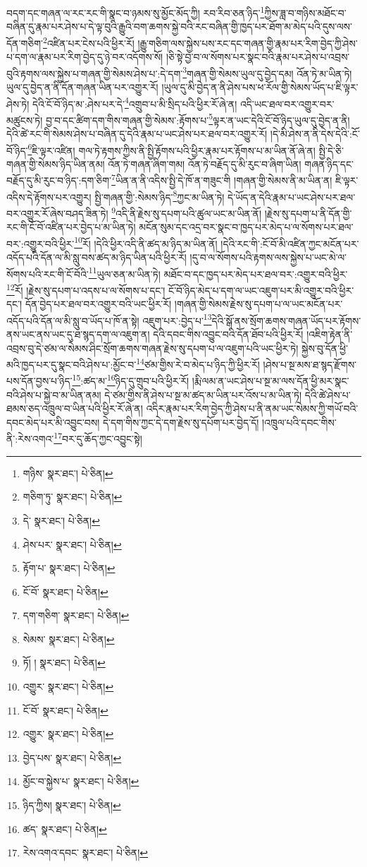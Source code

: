 བདག་དང་གཞན་ལ་རང་རང་གི་སྣང་བ་ཉམས་སུ་མྱོང་མོད་ཀྱི། རབ་རིབ་ཅན་ཉིད་\footnote{གཉིས་  སྣར་ཐང་།  པེ་ཅིན། }ཀྱིས་ཟླ་བ་གཉིས་མཐོང་བ་བཞིན་དུ་རྣམ་པར་ཤེས་པ་དེ་ལྟ་བུའི་རྒྱུའི་བག་ཆགས་སྐྱེ་བའི་རང་བཞིན་གྱི་ཁྱད་པར་ཐོག་མ་མེད་པའི་དུས་ལས་དོན་གཅིག་\footnote{གཅིག་ཏུ་  སྣར་ཐང་།  པེ་ཅིན། }འཛིན་པར་ངེས་པའི་ཕྱིར་རོ། །རྒྱུ་གཅིག་ལས་སྐྱེས་པས་རང་དང་གཞན་གྱི་རྣམ་པར་རིག་བྱེད་ཀྱི་ཤེས་པ་དག་ལ་རྣམ་པར་རིག་བྱེད་དུ་ཉེ་བར་འདོགས་སོ། །ཅི་སྟེ་བྱ་བ་ལ་སོགས་པར་སྣང་བའི་རྣམ་པར་ཤེས་པ་འབྲས་བུའི་རྟགས་ལས་སྐྱེས་པ་གཞན་གྱི་སེམས་ཤེས་པ་:དེ་དག་\footnote{དེ་  སྣར་ཐང་།  པེ་ཅིན། }གཞན་གྱི་སེམས་ཡུལ་དུ་བྱེད་དམ། འོན་ཏེ་མ་ཡིན་ཏེ། ཡུལ་དུ་བྱེད་ན་ནི་དོན་གཞན་ཡིན་པར་འགྱུར་རོ། །ཡུལ་དུ་མི་བྱེད་ན་ནི་ཤེས་པས་ཕ་རོལ་གྱི་སེམས་ཡོད་པ་ཇི་ལྟར་ཤེས་ཏེ། དེའི་ངོ་བོ་ཉིད་མ་:ཤེས་པར་དེ་\footnote{ཤེས་པར་  སྣར་ཐང་།  པེ་ཅིན། }འགྲུབ་པ་མི་སྲིད་པའི་ཕྱིར་རོ་ཞེ་ན། འདི་ཡང་ཐལ་བར་འགྱུར་བར་མཚུངས་ཏེ། བྱ་བ་དང་ཚིག་དག་གིས་གཞན་གྱི་སེམས་:རྟོགས་པ་\footnote{རྟོག་པ་  སྣར་ཐང་།  པེ་ཅིན། }ལྟར་ན་ཡང་དེའི་ངོ་བོ་ཉིད་ཡུལ་དུ་བྱེད་ན་ནི། དེའི་ཚེ་རང་གི་སེམས་ཤེས་པ་བཞིན་དུ་དེའི་རྣམ་པ་ཡང་ཤེས་པར་ཐལ་བར་འགྱུར་རོ། །དེ་མི་ཤེས་ན་ནི་དེས་དེའི་:ངོ་བོ་ཉིད་\footnote{ངོ་བོ་  སྣར་ཐང་།  པེ་ཅིན། }ཇི་ལྟར་འཛིན། གལ་ཏེ་རྟགས་ཀྱིས་ནི་སྤྱི་རྟོགས་པའི་ཕྱིར་རྣམ་པར་རྟོགས་པ་མ་ཡིན་ནོ་ཞེ་ན། སྤྱི་དེ་ཅི་གཞན་གྱི་སེམས་ཉིད་ཡིན་ནམ། འོན་ཏེ་གཞན་ཞིག་གམ། འོན་ཏེ་བརྗོད་དུ་མི་རུང་བ་ཞིག་ཡིན། གཞན་ཉིད་དང་བརྗོད་དུ་མི་རུང་བ་ཉིད་:དག་ཅིག་\footnote{དག་གཅིག་  སྣར་ཐང་།  པེ་ཅིན། }ཡིན་ན་ནི་འདིས་སྤྱི་དེ་ཁོ་ན་གཟུང་གི །གཞན་གྱི་སེམས་ནི་མ་ཡིན་ན། ཇི་ལྟར་འདིས་དེ་རྟོགས་པར་འགྱུར། སྤྱི་གཞན་གྱི་:སེམས་ཉིད་\footnote{སེམས་  སྣར་ཐང་།  པེ་ཅིན། }ཀྱང་མ་ཡིན་ཏེ། དེ་ཡོད་ན་དེའི་རྣམ་པ་ཡང་ཤེས་པར་ཐལ་བར་འགྱུར་རོ་ཞེས་བཤད་ཟིན་ཏེ། \footnote{ཏོ། །   སྣར་ཐང་།  པེ་ཅིན། }འདི་ནི་རྗེས་སུ་དཔག་པའི་ཚུལ་ཡང་མ་ཡིན་ནོ། །རྗེས་སུ་དཔག་པ་ནི་དོན་གྱི་རང་གི་ངོ་བོ་འཛིན་པར་བྱེད་པ་མ་ཡིན་ཏེ། མངོན་སུམ་དང་འདྲ་བར་སྣང་བ་ཁྱད་པར་མེད་པ་ལ་སོགས་པར་ཐལ་བར་:འགྱུར་བའི་ཕྱིར་\footnote{འགྱུར་  སྣར་ཐང་།  པེ་ཅིན། }རོ། །དེའི་ཕྱིར་འདི་ནི་ཚད་མ་ཉིད་མ་ཡིན་ནོ། །དེའི་རང་གི་:ངོ་བོ་མི་འཛིན་ཀྱང་མངོན་པར་འདོད་པའི་དོན་ལ་མི་སླུ་བས་ཚད་མ་ཉིད་ཡིན་པའི་ཕྱིར་རོ། །དུ་བ་ལ་སོགས་པའི་རྟགས་ལས་སྐྱེས་པ་ཡང་མེ་ལ་སོགས་པའི་རང་གི་ངོ་བོའི་\footnote{ངོ་བོ་  སྣར་ཐང་།  པེ་ཅིན། }ཡུལ་ཅན་མ་ཡིན་ཏེ། མཐོང་བ་དང་ཁྱད་པར་མེད་པར་ཐལ་བར་:འགྱུར་བའི་ཕྱིར་\footnote{འགྱུར་  སྣར་ཐང་།  པེ་ཅིན། }རོ། །རྗེས་སུ་དཔག་པ་འདས་པ་ལ་སོགས་པ་དང་། ངོ་བོ་ཉིད་མེད་པ་དག་ལ་ཡང་འཇུག་པར་མི་འགྱུར་བའི་ཕྱིར་དང་། དོན་བྱེད་པར་ཐལ་བར་འགྱུར་བའི་ཡང་ཕྱིར་རོ། །གཞན་གྱི་སེམས་རྗེས་སུ་དཔག་པ་ལ་ཡང་མངོན་པར་འདོད་པའི་དོན་ལ་མི་སླུ་བ་ཡོད་པ་ཁོ་ན་སྟེ། འཇུག་པར་:བྱེད་པ་\footnote{བྱེད་པས་  སྣར་ཐང་།  པེ་ཅིན། }དེའི་སྒོ་ནས་སྲོག་ཆགས་གཞན་ཡོད་པར་རྟོགས་ནས་ཡང་ནས་ཡང་དུ་ཐ་སྙད་དག་ལ་འཇུག་ན། དེའི་དབང་གིས་འབྱུང་བའི་དོན་ཐོབ་པའི་ཕྱིར་རོ། །འཇིག་རྟེན་ནི་འབྲས་བུ་དེ་ཙམ་ལ་སེམས་ཤིང་སྲོག་ཆགས་གཞན་རྗེས་སུ་དཔག་པ་ལ་འཇུག་པའི་ཡང་ཕྱིར་ཏེ། སྐྱེས་བུ་དོན་ཕྱི་མའི་ཁྱད་པར་དུ་སྣང་བའི་ཤེས་པ་:མྱོང་བ་\footnote{མྱོང་བ་སྐྱེས་པ་  སྣར་ཐང་།  པེ་ཅིན། }ཙམ་གྱིས་རེ་བ་མེད་པ་ཉིད་ཀྱི་ཕྱིར་རོ། །ཤེས་པ་སྔ་མས་ཐ་སྙད་རྫོགས་པས་དོན་བྱས་པ་ཉིད་\footnote{ཉིད་ཀྱིས།   སྣར་ཐང་།  པེ་ཅིན། }:ཚད་མ་\footnote{ཚད་  སྣར་ཐང་།  པེ་ཅིན། }ཉིད་དུ་གྲུབ་པའི་ཕྱིར་རོ། །རྨི་ལམ་ན་ཡང་ཤེས་པ་སྔ་མ་ལས་དོན་ཕྱི་མར་སྣང་བའི་ཤེས་པ་སྐྱེ་བ་མ་ཡིན་ནམ། དེ་ཙམ་གྱིས་ནི་ཤེས་པ་སྔ་མ་ཚད་མ་ཡིན་པར་འོས་པ་མ་ཡིན་ཏེ། དེའི་ཚེ་ཤེས་པ་ཐམས་ཅད་འཁྲུལ་བ་ཡིན་པའི་ཕྱིར་རོ་ཞེ་ན། འདིར་རྣམ་པར་རིག་བྱེད་ཀྱི་ཤེས་པ་ནི་ནམ་ཡང་སེམས་ཀྱི་གཡོ་བའི་དབང་མེད་པར་མི་འབྱུང་བས། དེ་དག་གིས་ཀྱང་དེ་དག་རྗེས་སུ་དཔོག་པར་བྱེད་དོ། །འཁྲུལ་པའི་དབང་གིས་ནི་:རེས་འགའ་\footnote{རེས་འགའ་དབང་  སྣར་ཐང་།  པེ་ཅིན། }བར་དུ་ཆོད་ཀྱང་འབྱུང་སྟེ། 